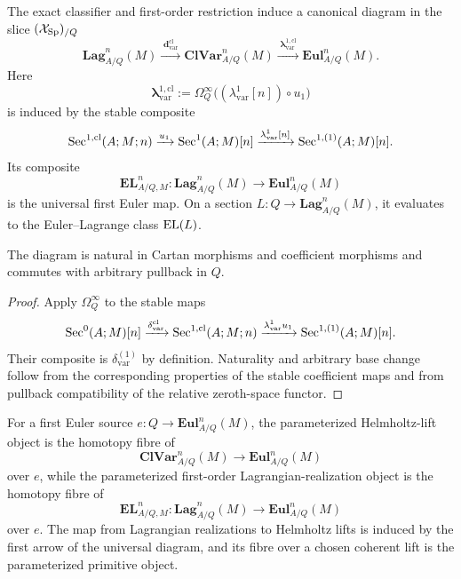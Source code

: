 \begin{theorem}
\label{thm:var-universal-moduli-diagram}
The exact classifier and first-order restriction induce a canonical diagram in the slice \((\mathcal{X}_{\mathrm{Sp}})_{/Q}\)
\[
    \boxed{
    \mathbf{Lag}^n_{A/Q}(M)
    \xrightarrow{\;\mathbf d^{\mathrm{cl}}_{\mathrm{var}}\;}
    \mathbf{ClVar}^n_{A/Q}(M)
    \xrightarrow{\;\mathbf\lambda^{1,\mathrm{cl}}_{\mathrm{var}}\;}
    \mathbf{Eul}^n_{A/Q}(M).
    }
\]
Here
\[
    \mathbf\lambda^{1,\mathrm{cl}}_{\mathrm{var}}
    :=
    \Omega_Q^\infty\bigl((\lambda^1_{\mathrm{var}}[n])\circ u_1\bigr)
\]
is induced by the stable composite
\[
    \operatorname{Sec}^{1,\mathrm{cl}}(A;M;n)
    \xrightarrow{u_1}
    \operatorname{Sec}^1(A;M)[n]
    \xrightarrow{\lambda^1_{\mathrm{var}}[n]}
    \operatorname{Sec}^{1,(1)}(A;M)[n].
\]
Its composite
\[
    \boxed{
    \mathbf{EL}_{A/Q,M}^n:
    \mathbf{Lag}^n_{A/Q}(M)
    \longrightarrow
    \mathbf{Eul}^n_{A/Q}(M)
    }
\]
is the universal first Euler map. On a section \(L:Q\to\mathbf{Lag}^n_{A/Q}(M)\), it evaluates to the Euler--Lagrange class \(\operatorname{EL}(L)\).

The diagram is natural in Cartan morphisms and coefficient morphisms and commutes with arbitrary pullback in \(Q\).
\end{theorem}

\begin{proof}
Apply \(\Omega_Q^\infty\) to the stable maps
\[
    \operatorname{Sec}^0(A;M)[n]
    \xrightarrow{\delta^{\mathrm{cl}}_{\mathrm{var}}}
    \operatorname{Sec}^{1,\mathrm{cl}}(A;M;n)
    \xrightarrow{\lambda^1_{\mathrm{var}}u_1}
    \operatorname{Sec}^{1,(1)}(A;M)[n].
\]
Their composite is \(\delta^{(1)}_{\mathrm{var}}\) by definition. Naturality and arbitrary base change follow from the corresponding properties of the stable coefficient maps and from pullback compatibility of the relative zeroth-space functor.
\end{proof}

\begin{corollary}
\label{cor:var-inverse-problem-fibres-universal}
For a first Euler source \(e:Q\to\mathbf{Eul}^n_{A/Q}(M)\), the parameterized Helmholtz-lift object is the homotopy fibre of
\[
    \mathbf{ClVar}^n_{A/Q}(M)
    \longrightarrow
    \mathbf{Eul}^n_{A/Q}(M)
\]
over \(e\), while the parameterized first-order Lagrangian-realization object is the homotopy fibre of
\[
    \mathbf{EL}_{A/Q,M}^n:
    \mathbf{Lag}^n_{A/Q}(M)
    \longrightarrow
    \mathbf{Eul}^n_{A/Q}(M)
\]
over \(e\). The map from Lagrangian realizations to Helmholtz lifts is induced by the first arrow of the universal diagram, and its fibre over a chosen coherent lift is the parameterized primitive object.
\end{corollary}

